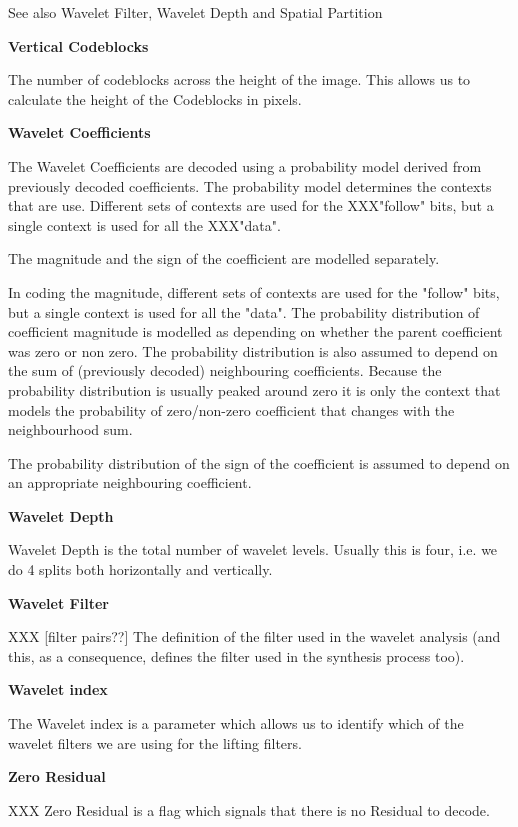 See also Wavelet Filter, Wavelet Depth and Spatial Partition

\textbf{Vertical Codeblocks}

The number of codeblocks across the height of the image. This allows us
to calculate the height of the Codeblocks in pixels.

\textbf{Wavelet Coefficients}

The Wavelet Coefficients are decoded using a probability model derived
from previously decoded coefficients. The probability model determines
the contexts that are use. Different sets of contexts are used for the
XXX"follow" bits, but a single context is used for all the XXX"data".

The magnitude and the sign of the coefficient are modelled separately.

In coding the magnitude, different sets of contexts are used for the
"follow" bits, but a single context is used for all the "data". The
probability distribution of coefficient magnitude is modelled as
depending on whether the parent coefficient was zero or non zero. The
probability distribution is also assumed to depend on the sum of
(previously decoded) neighbouring coefficients. Because the probability
distribution is usually peaked around zero it is only the context that
models the probability of zero/non-zero coefficient that changes with
the neighbourhood sum.

The probability distribution of the sign of the coefficient is assumed
to depend on an appropriate neighbouring coefficient.

\textbf{Wavelet Depth }

Wavelet Depth is the total number of wavelet levels. Usually this is
four, i.e. we do 4 splits both horizontally and vertically.

\textbf{Wavelet Filter}

XXX [filter pairs??] The definition of the filter used in the wavelet
analysis (and this, as a consequence, defines the filter used in the
synthesis process too).

\textbf{Wavelet index}

The Wavelet index is a parameter which allows us to identify which of
the wavelet filters we are using for the lifting filters.

\textbf{Zero Residual}

XXX Zero Residual is a flag which signals that there is no Residual to
decode.
